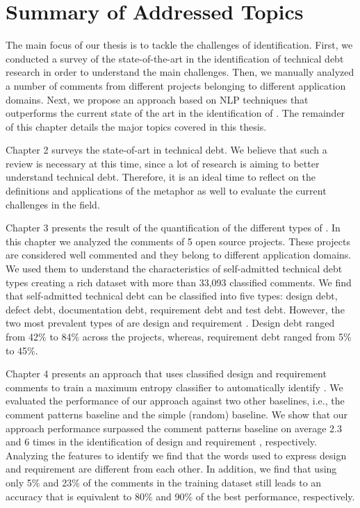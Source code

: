 
\section{Summary of Addressed Topics}

The main focus of our thesis is to tackle the challenges of \SATD identification. First, we conducted a survey of the state-of-the-art in the identification of technical debt research in order to understand the main challenges. Then, we manually analyzed a number of comments from different projects belonging to different application domains. Next, we propose an approach based on NLP techniques that outperforms the current state of the art in the identification of \SATD. The remainder of this chapter details the major topics covered in this thesis.

Chapter 2 surveys the state-of-art in technical debt. We believe that such a review is necessary at this time, since a lot of research is aiming to better understand technical debt. Therefore, it is an ideal time to reflect on the definitions and applications of the metaphor as well to evaluate the current challenges in the field.

Chapter 3 presents the result of the quantification of the different types of \SATD. In this chapter we analyzed the comments of 5 open source projects. These projects are considered well commented and they belong to different application domains. We used them to understand the characteristics of self-admitted technical debt types creating a rich dataset with more than 33,093 classified comments. We find that self-admitted technical debt can be classified into five types: design debt, defect debt, documentation debt, requirement debt and test debt. However, the two most prevalent types of \SATD are design and requirement \SATD. Design debt ranged from 42\% to 84\% across the projects, whereas, requirement debt ranged from 5\% to 45\%. 

Chapter 4 presents an approach that uses classified design and requirement \SATD comments to train a maximum entropy classifier to automatically identify \SATD. We evaluated the performance of our approach against two other baselines, i.e., the comment patterns baseline and the simple (random) baseline. We show that our approach performance surpassed the comment patterns baseline on average 2.3 and 6 times in the identification of design and requirement \SATD, respectively. Analyzing the features to identify \SATD we find that the words used to express design and requirement \SATD are different from each other. In addition, we find that using only 5\% and 23\% of the comments in the training dataset still leads to an accuracy that is equivalent to 80\% and 90\% of the best performance, respectively.

